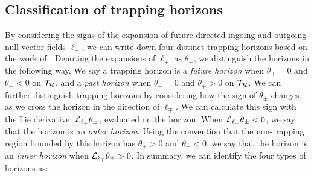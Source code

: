 \subsection{Classification of trapping horizons}
\label{sec:horizonclassify}
By considering the signs of the expansion of future-directed ingoing and outgoing null vector fields $\ell_\pm$, we can write down four distinct trapping horizons based on the work of \cite{Binetruy:2014ela, Helou:2015zma}. Denoting the expansions of $\ell_\pm$ as $\theta_\pm$, we distinguish the horizons in the following way. We say a trapping horizon is a \emph{future horizon} when $\theta_+ = 0$ and $\theta_- < 0$ on $\mathcal{T}_{\cal H}$, and a \emph{past horizon} when  $\theta_- = 0$ and $\theta_+ > 0$ on $\mathcal{T}_{\cal H}$. We can further distinguish trapping horizons by considering how the sign of $\theta_\pm$ changes as we cross the horizon in the direction of $\ell_\mp$. We can calculate this sign with the Lie derivative: ${\cal L}_{\ell_\mp} \theta_\pm$, evaluated on the horizon. When ${\cal L}_{\ell_\mp} \theta_\pm < 0$, we say that the horizon is an \emph{outer horizon}. Using the convention that the non-trapping region bounded by this horizon has $\theta_+ > 0$ and $\theta_- <0$, we say that the horizon is an \emph{inner horizon} when ${\cal L}_{\ell_\mp} \theta_\pm > 0$. In summary, we can identify the four types of horizons as:
